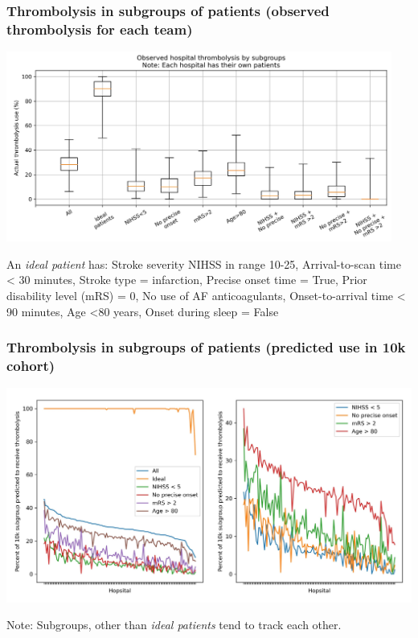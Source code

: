 \documentclass{beamer}
\begin{document}

\begin{frame}
\frametitle{Thrombolysis in subgroups of patients (observed thrombolysis for each team)}

\begin{center}
\includegraphics[width=0.95\textwidth]{./images/15b_actual_subgroup_violin.jpg}
\end{center}


\scriptsize An \emph{ideal patient} has: Stroke severity NIHSS in range 10-25, Arrival-to-scan time \textless{} 30 minutes, Stroke type = infarction, Precise onset time = True, Prior disability level (mRS) = 0, No use of AF anticoagulants, Onset-to-arrival time \textless{} 90 minutes, Age \textless{}80 years, Onset during sleep = False
\end{frame}


\begin{frame}
\frametitle{Thrombolysis in subgroups of patients (predicted use in 10k cohort)}

    \begin{center}
    \includegraphics[width=1.0\textwidth]{./images/15_10k_subgroup.jpg}
    \end{center}

\footnotesize Note: Subgroups, other than \emph{ideal patients} tend to track each other.  

\end{frame}
\end{document}
